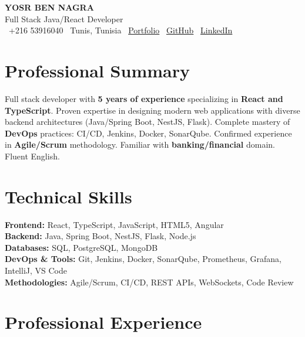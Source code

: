 \documentclass[10pt,a4paper]{article}
\begin{document}
\begin{center}
  {\Large\bfseries\color{primary} YOSR BEN NAGRA}\\[2pt]
  {\small\color{darkgray} Full Stack Java/React Developer}\\[3pt]
  {\footnotesize
    \faPhone\ +216 53916040 \quad
    \faMapMarker*\ Tunis, Tunisia \quad
    \faGlobe\ \href{https://portfolio-yosr.vercel.app/en}{Portfolio} \quad
    \faGithub\ \href{https://github.com/YosrBennagra}{GitHub} \quad
    \faLinkedin\ \href{https://www.linkedin.com/in/yosr-ben-nagra/}{LinkedIn}
  }
\end{center}

\vspace{3pt}

\section*{Professional Summary}
\vspace{1pt}
{\small
Full stack developer with \textbf{5 years of experience} specializing in \textbf{React and TypeScript}. Proven expertise in designing modern web applications with diverse backend architectures (Java/Spring Boot, NestJS, Flask). Complete mastery of \textbf{DevOps} practices: CI/CD, Jenkins, Docker, SonarQube. Confirmed experience in \textbf{Agile/Scrum} methodology. Familiar with \textbf{banking/financial} domain. Fluent English.
}

\vspace{5pt}

\section*{Technical Skills}
\vspace{2pt}
{\small
\textbf{Frontend:} React, TypeScript, JavaScript, HTML5, Angular\\[2pt]
\textbf{Backend:} Java, Spring Boot, NestJS, Flask, Node.js\\[2pt]
\textbf{Databases:} SQL, PostgreSQL, MongoDB\\[2pt]
\textbf{DevOps \& Tools:} Git, Jenkins, Docker, SonarQube, Prometheus, Grafana, IntelliJ, VS Code\\[2pt]
\textbf{Methodologies:} Agile/Scrum, CI/CD, REST APIs, WebSockets, Code Review
}

\vspace{5pt}

\section*{Professional Experience}
\vspace{2pt}
\end{document}
